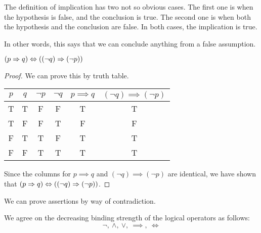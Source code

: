 \begin{enumerate}[(a)]
	      \begin{remark}
		      The definition of implication has two not so obvious cases. The first one is when the hypothesis is false, and the conclusion is true. The second one is when both the hypothesis and the conclusion are false. In both cases, the implication is true.

		      In other words, this says that we can conclude anything from a false assumption.
	      \end{remark}

	      \begin{theorem}
		      \((p \Rightarrow q) \Leftrightarrow \qty((\lnot q) \Rightarrow (\lnot p))\)
	      \end{theorem}
	      \begin{proof}
		      We can prove this by truth table.
		      \begin{table}[H]
			      \centering
			      \def\arraystretch{1.15}\tabcolsep=10pt
			      \begin{tabular}{|c|c||c|c|c|c|}
				      \hline
				      \(p\) & \(q\) & \(\lnot p\) & \(\lnot q\) & \(p \implies q\) & \((\lnot q) \implies (\lnot p)\) \\
				      \hline
				      T     & T     & F           & F           & T                & T                                \\
				      T     & F     & F           & T           & F                & F                                \\
				      F     & T     & T           & F           & T                & T                                \\
				      F     & F     & T           & T           & T                & T                                \\
				      \hline
			      \end{tabular}
		      \end{table}
		      Since the columns for \(p \implies q\) and \((\lnot q) \implies (\lnot p)\) are identical, we have shown that \((p \Rightarrow q) \Leftrightarrow \qty((\lnot q) \Rightarrow (\lnot p))\).
	      \end{proof}

	      \begin{corollary}
		      We can prove assertions by way of contradiction.
	      \end{corollary}
\end{enumerate}

\begin{remark}
	We agree on the decreasing binding strength of the logical operators as follows:
	\begin{equation*}
		\lnot,\ \land,\ \lor,\ \implies,\ \iff
	\end{equation*}
\end{remark}

